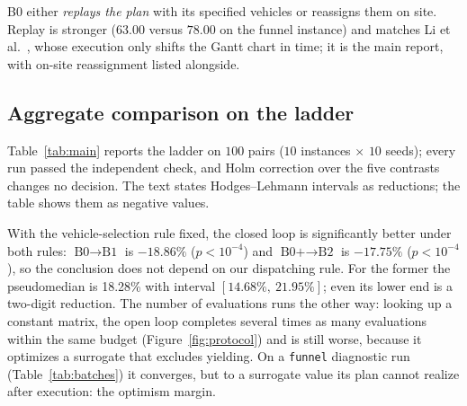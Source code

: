 \documentclass[manuscript,screen,review]{acmart}
\newcommand{\NCases}{10}
\newcommand{\NSeeds}{10}
\newcommand{\NPairs}{100}
\newcommand{\GainLoopRule}{18.86\%}      %
\newcommand{\PLoopRule}{<10^{-4}}
\newcommand{\GainLoopProbe}{17.75\%}     %
\newcommand{\PLoopProbe}{<10^{-4}}
\newcommand{\HLLoopRule}{18.28\%}
\newcommand{\CILoopRule}{$[14.68\%,\ 21.95\%]$}
\begin{document}
B0 either \emph{replays the plan} with its specified vehicles or reassigns them on site. Replay is stronger ($63.00$ versus $78.00$ on the funnel instance) and matches Li et al.~\cite{li2026framework}, whose execution only shifts the Gantt chart in time; it is the main report, with on-site reassignment listed alongside.

\subsection{Aggregate comparison on the ladder}
\label{sec:main}

Table~\ref{tab:main} reports the ladder on $\NPairs$ pairs ($\NCases$ instances $\times$ $\NSeeds$ seeds); every run passed the independent check, and Holm correction over the five contrasts changes no decision.
The text states Hodges--Lehmann intervals as reductions; the table shows them as negative values.

\begin{table}[t]
\caption{Four-level ladder under an equal wall-clock budget, and the four one-factor contrasts. Negative is better.
$n=\NPairs$ pairs on $(\text{instance},\text{seed})$; two-sided Wilcoxon signed-rank, Holm-corrected over the five contrasts
($^{*}p<0.05$, $^{**}p<0.01$, $^{***}p<0.001$). HL: Hodges--Lehmann pseudomedian with $95\%$ interval.
Bold marks our configuration, not a per-instance winner.}
\label{tab:main}
\small

\end{table}

With the vehicle-selection rule fixed, the closed loop is significantly better under both rules: $\text{B0}\to\text{B1}$ is $-\GainLoopRule$ ($p\PLoopRule$) and $\text{B0+}\to\text{B2}$ is $-\GainLoopProbe$ ($p\PLoopProbe$), so the conclusion does not depend on our dispatching rule.
For the former the pseudomedian is \HLLoopRule{} with interval \CILoopRule{}; even its lower end is a two-digit reduction.
The number of evaluations runs the other way: looking up a constant matrix, the open loop completes several times as many evaluations within the same budget (Figure~\ref{fig:protocol}) and is still worse, because it optimizes a surrogate that excludes yielding.
On a \texttt{funnel} diagnostic run (Table~\ref{tab:batches}) it converges, but to a surrogate value its plan cannot realize after execution: the optimism margin.
\end{document}
